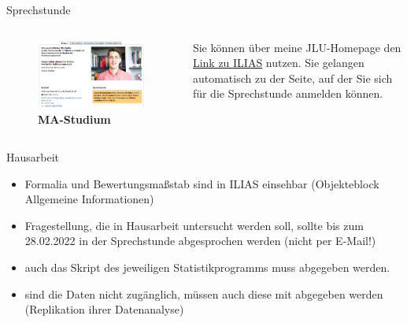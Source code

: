 \documentclass[11pt]{beamer}
\begin{document}
\begin{frame}[t]{Sprechstunde}
	\begin{columns}
		\begin{column}{0.5\textwidth}
		\begin{figure}[ht]
		\includegraphics[width=\textwidth]{pics/pre6.png}
		\caption{\textbf{MA-Studium}}
	\end{figure}
		\end{column}
		\begin{column}{0.5\textwidth}
			Sie können über meine JLU-Homepage den \href{https://ilias.uni-giessen.de/ilias/goto.php?target=usr_172921&client_id=JLUG}{Link zu ILIAS} nutzen. Sie gelangen automatisch zu der Seite, auf der Sie sich für die Sprechstunde anmelden können.
		\end{column}
	\end{columns}
\end{frame}

\begin{frame}[t]{Hausarbeit}
	\begin{itemize}
		\item Formalia und Bewertungsmaßstab sind in ILIAS einsehbar (Objekteblock Allgemeine Informationen)
		\item Fragestellung, die in Hausarbeit untersucht werden soll, sollte bis zum 28.02.2022 in der Sprechstunde abgesprochen werden (nicht per E-Mail!)
		\item auch das Skript des jeweiligen Statistikprogramms muss abgegeben werden. 
		\item sind die Daten nicht zugänglich, müssen auch diese mit abgegeben werden (Replikation ihrer Datenanalyse)
	\end{itemize}
\end{frame}
\end{document}
